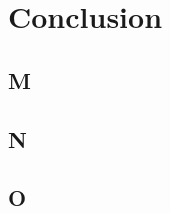 \chapter{Conclusion}\label{ch:conclusion}

\section{M}\label{sec:M}

\section{N}\label{sec:N}

\section{O}\label{sec:O}
